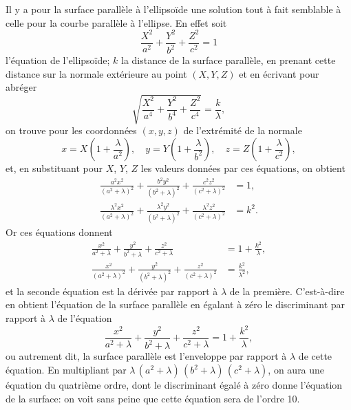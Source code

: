 \documentclass[11pt,a4paper]{book}
\begin{document}
Il y a pour la surface parall\`{e}le \`{a} l'ellipso\"{i}de une solution tout \`{a} fait semblable \`{a} celle pour la courbe parall\`{e}le \`{a} l'ellipse. En effet soit
\[
\frac{X^2}{a^2} + \frac{Y^2}{b^2} + \frac{Z^2}{c^2} = 1
\]
l'\'{e}quation de l'ellipso\"{i}de; $k$ la distance de la surface parall\`{e}le, en prenant cette distance sur la normale ext\'{e}rieure au point $(X, Y, Z)$ et en \'{e}crivant pour abr\'{e}ger
\[
\sqrt{\frac{X^2}{a^4} + \frac{Y^2}{b^4} + \frac{Z^2}{c^4}} = \frac{k}{\lambda},
\]
on trouve pour les coordonn\'{e}es $(x, y, z)$ de l'extr\'{e}mit\'{e} de la normale
\[
x = X\left(1 + \frac{\lambda}{a^2}\right), \quad y = Y\left(1 + \frac{\lambda}{b^2}\right), \quad z = Z\left(1 + \frac{\lambda}{c^2}\right),
\]
et, en substituant pour $X$, $Y$, $Z$ les valeurs donn\'{e}es par ces \'{e}quations, on obtient
\begin{align*}
\frac{a^2x^2}{(a^2+\lambda)^2} + \frac{b^2y^2}{(b^2+\lambda)^2} + \frac{c^2z^2}{(c^2+\lambda)^2} &= 1, \\
\frac{\lambda^2 x^2}{(a^2+\lambda)^2} + \frac{\lambda^2 y^2}{(b^2+\lambda)^2} + \frac{\lambda^2 z^2}{(c^2+\lambda)^2} &= k^2.
\end{align*}
Or ces \'{e}quations donnent
\begin{align*}
\frac{x^2}{a^2+\lambda} + \frac{y^2}{b^2+\lambda} + \frac{z^2}{c^2+\lambda} &= 1 + \frac{k^2}{\lambda}, \\
\frac{x^2}{(a^2+\lambda)^2} + \frac{y^2}{(b^2+\lambda)^2} + \frac{z^2}{(c^2+\lambda)^2} &= \frac{k^2}{\lambda^2},
\end{align*}
et la seconde \'{e}quation est la d\'{e}riv\'{e}e par rapport \`{a} $\lambda$ de la premi\`{e}re. C'est-\`{a}-dire en obtient l'\'{e}quation de la surface parall\`{e}le en \'{e}galant \`{a} z\'{e}ro le discriminant par rapport \`{a} $\lambda$ de l'\'{e}quation
\[
\frac{x^2}{a^2+\lambda} + \frac{y^2}{b^2+\lambda} + \frac{z^2}{c^2+\lambda} = 1 + \frac{k^2}{\lambda},
\]
ou autrement dit, la surface parall\`{e}le est l'enveloppe par rapport \`{a} $\lambda$ de cette \'{e}quation. En multipliant par $\lambda\,(a^2+\lambda)\,(b^2+\lambda)\,(c^2+\lambda)$, on aura une \'{e}quation du quatri\`{e}me ordre, dont le discriminant \'{e}gal\'{e} \`{a} z\'{e}ro donne l'\'{e}quation de la surface: on voit sans peine que cette \'{e}quation sera de l'ordre 10.
\end{document}
